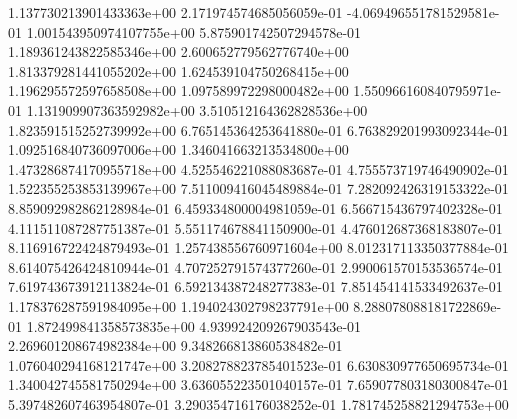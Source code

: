 1.137730213901433363e+00
2.171974574685056059e-01
-4.069496551781529581e-01
1.001543950974107755e+00
5.875901742507294578e-01
1.189361243822585346e+00
2.600652779562776740e+00
1.813379281441055202e+00
1.624539104750268415e+00
1.196295572597658508e+00
1.097589972298000482e+00
1.550966160840795971e-01
1.131909907363592982e+00
3.510512164362828536e+00
1.823591515252739992e+00
6.765145364253641880e-01
6.763829201993092344e-01
1.092516840736097006e+00
1.346041663213534800e+00
1.473286874170955718e+00
4.525546221088083687e-01
4.755573719746490902e-01
1.522355253853139967e+00
7.511009416045489884e-01
7.282092426319153322e-01
8.859092982862128984e-01
6.459334800004981059e-01
6.566715436797402328e-01
4.111511087287751387e-01
5.551174678841150900e-01
4.476012687368183807e-01
8.116916722424879493e-01
1.257438556760971604e+00
8.012317113350377884e-01
8.614075426424810944e-01
4.707252791574377260e-01
2.990061570153536574e-01
7.619743673912113824e-01
6.592134387248277383e-01
7.851454141533492637e-01
1.178376287591984095e+00
1.194024302798237791e+00
8.288078088181722869e-01
1.872499841358573835e+00
4.939924209267903543e-01
2.269601208674982384e+00
9.348266813860538482e-01
1.076040294168121747e+00
3.208278823785401523e-01
6.630830977650695734e-01
1.340042745581750294e+00
3.636055223501040157e-01
7.659077803180300847e-01
5.397482607463954807e-01
3.290354716176038252e-01
1.781745258821294753e+00
